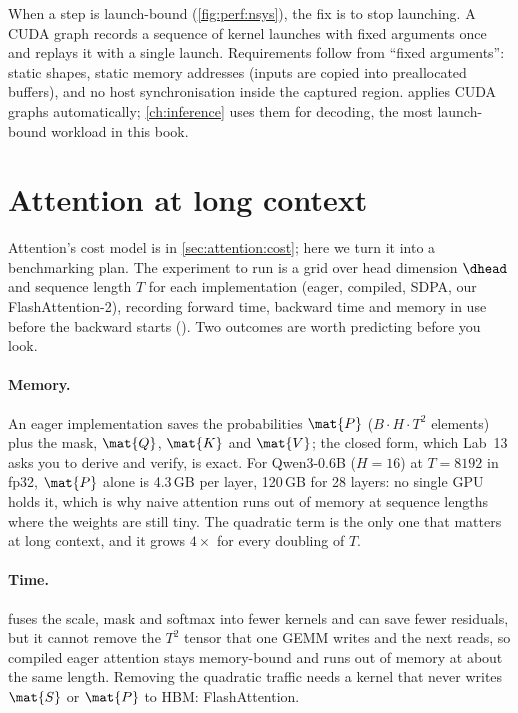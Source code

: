 \begin{deepdive}
When a step is launch-bound (\cref{fig:perf:nsys}), the fix is to stop launching. A CUDA graph
records a sequence of kernel launches with fixed arguments once and replays it with a single
launch. Requirements follow from ``fixed arguments'': static shapes, static memory addresses (inputs
are copied into preallocated buffers), and no host synchronisation inside the captured region.
 applies CUDA graphs automatically; \cref{ch:inference}
uses them for decoding, the most launch-bound workload in this book.
\end{deepdive}

\section{Attention at long context}\label{sec:perf:attn}

Attention's cost model is in \cref{sec:attention:cost}; here we turn it into a benchmarking plan.
The experiment to run is a grid over head dimension $\dhead$ and sequence length $T$ for each
implementation (eager, compiled, SDPA, our FlashAttention-2), recording forward time, backward time
and memory in use before the backward starts (). Two outcomes are worth
predicting before you look.

\paragraph{Memory.} An eager implementation saves the probabilities $\mat{P}$
($B\cdot H\cdot T^2$ elements) plus the mask, $\mat{Q}$, $\mat{K}$ and $\mat{V}$; the closed form,
which Lab~13 asks you to derive and verify, is exact. For Qwen3-0.6B ($H=16$) at $T=8192$ in fp32,
$\mat{P}$ alone is 4.3\,GB per layer, 120\,GB for 28 layers: no single GPU holds it, which is why
naive attention runs out of memory at sequence lengths where the weights are still tiny. The quadratic
term is the only one that matters at long context, and it grows $4\times$ for every doubling of $T$.

\paragraph{Time.}  fuses the scale, mask and softmax into fewer kernels and
can save fewer residuals, but it cannot remove the $T^2$ tensor that one GEMM writes and the next
reads, so compiled eager attention stays memory-bound and runs out of memory at about the same
length. Removing the quadratic traffic needs a kernel that never writes $\mat{S}$ or $\mat{P}$ to
HBM: FlashAttention.


